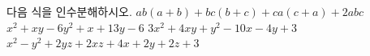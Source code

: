 다음 식을 인수분해하시오.
 $ab(a+b)+bc(b+c)+ca(c+a)+2abc$
 $x^2+xy-6y^2+x+13y-6$
 $3x^2+4xy+y^2-10x-4y+3$
 $x^2-y^2+2yz+2xz+4x+2y+2z+3$
